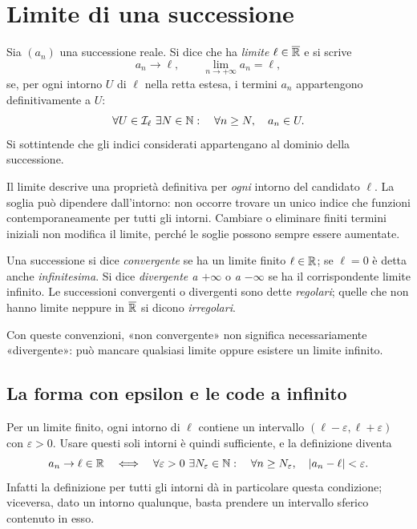 \section{Limite di una successione}

\begin{definizione}[Limite]
Sia $(a_n)$ una successione reale. Si dice che ha \emph{limite} $\ell\in\overline{\mathbb{R}}$ e si scrive
\[
a_n\longrightarrow\ell,\qquad
\lim_{n\to+\infty}a_n=\ell,
\]
se, per ogni intorno $U$ di $\ell$ nella retta estesa, i termini $a_n$ appartengono definitivamente a $U$:
\[
\forall U\in\mathcal I_\ell\ \exists N\in\mathbb{N}:
\quad \forall n\ge N,\quad a_n\in U.
\]
Si sottintende che gli indici considerati appartengano al dominio della successione.
\end{definizione}

Il limite descrive una proprietà definitiva per \emph{ogni} intorno del candidato $\ell$. La soglia può dipendere dall'intorno: non occorre trovare un unico indice che funzioni contemporaneamente per tutti gli intorni. Cambiare o eliminare finiti termini iniziali non modifica il limite, perché le soglie possono sempre essere aumentate.

\begin{definizione}
Una successione si dice \emph{convergente} se ha un limite finito $\ell\in\mathbb{R}$; se $\ell=0$ è detta anche \emph{infinitesima}. Si dice \emph{divergente a $+\infty$} o \emph{a $-\infty$} se ha il corrispondente limite infinito. Le successioni convergenti o divergenti sono dette \emph{regolari}; quelle che non hanno limite neppure in $\overline{\mathbb{R}}$ si dicono \emph{irregolari}.
\end{definizione}

Con queste convenzioni, «non convergente» non significa necessariamente «divergente»: può mancare qualsiasi limite oppure esistere un limite infinito.

\subsection{La forma con epsilon e le code a infinito}

Per un limite finito, ogni intorno di $\ell$ contiene un intervallo $(\ell-\varepsilon,\ell+\varepsilon)$ con $\varepsilon>0$. Usare questi soli intorni è quindi sufficiente, e la definizione diventa
\[
a_n\to\ell\in\mathbb{R}
\quad\Longleftrightarrow\quad
\forall\varepsilon>0\ \exists N_\varepsilon\in\mathbb{N}:
\quad \forall n\ge N_\varepsilon,\quad |a_n-\ell|<\varepsilon.
\]
Infatti la definizione per tutti gli intorni dà in particolare questa condizione; viceversa, dato un intorno qualunque, basta prendere un intervallo sferico contenuto in esso.

